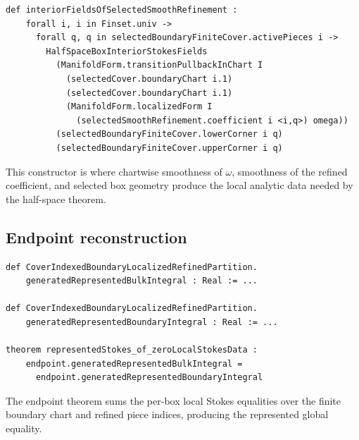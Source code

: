 \begin{lstlisting}[language=Lean,basicstyle=\ttfamily\scriptsize]
def interiorFieldsOfSelectedSmoothRefinement :
    forall i, i in Finset.univ ->
      forall q, q in selectedBoundaryFiniteCover.activePieces i ->
        HalfSpaceBoxInteriorStokesFields
          (ManifoldForm.transitionPullbackInChart I
            (selectedCover.boundaryChart i.1)
            (selectedCover.boundaryChart i.1)
            (ManifoldForm.localizedForm I
              (selectedSmoothRefinement.coefficient i <i,q>) omega))
          (selectedBoundaryFiniteCover.lowerCorner i q)
          (selectedBoundaryFiniteCover.upperCorner i q)
\end{lstlisting}

This constructor is where chartwise smoothness of \(\omega\), smoothness of the
refined coefficient, and selected box geometry produce the local analytic data
needed by the half-space theorem.

\subsection{Endpoint reconstruction}

\begin{lstlisting}[language=Lean,basicstyle=\ttfamily\footnotesize]
def CoverIndexedBoundaryLocalizedRefinedPartition.
    generatedRepresentedBulkIntegral : Real := ...

def CoverIndexedBoundaryLocalizedRefinedPartition.
    generatedRepresentedBoundaryIntegral : Real := ...

theorem representedStokes_of_zeroLocalStokesData :
    endpoint.generatedRepresentedBulkIntegral =
      endpoint.generatedRepresentedBoundaryIntegral
\end{lstlisting}

The endpoint theorem sums the per-box local Stokes equalities over the finite
boundary chart and refined piece indices, producing the represented global
equality.
